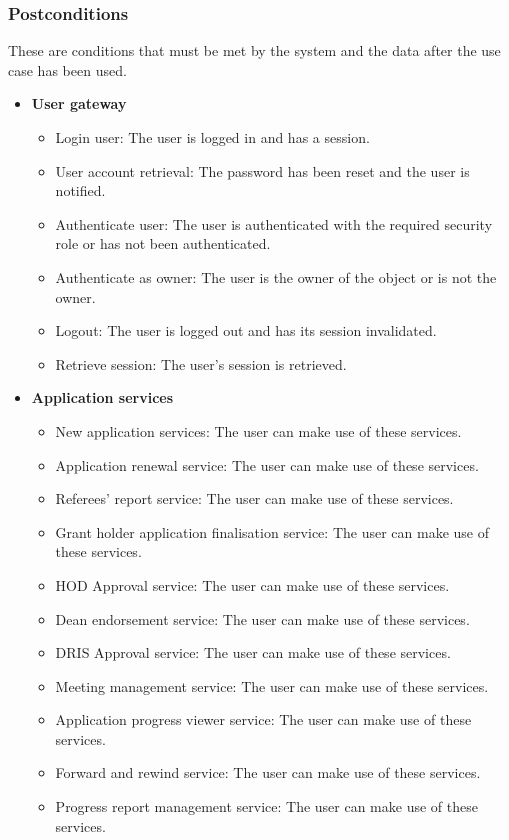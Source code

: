 \documentclass[12pt]{article}
\begin{document}
\subsubsection{Postconditions}
These are conditions that must be met by the system and the data after the use case has been used.\\
\begin{itemize}
	\item \textbf{User gateway}
		\begin{itemize}
			\item Login user: The user is logged in and has a session.
			\item User account retrieval: The password has been reset and the user is notified.				
			\item Authenticate user: The user is authenticated with the required security role or has not been authenticated.	
			\item Authenticate as owner: The user is the owner of the object or is not the owner.
			\item Logout: The user is logged out and has its session invalidated.
			\item Retrieve session: The user's session is retrieved.						
		\end{itemize}
		
	\item\textbf{Application services}
		\begin{itemize}
			\item New application services: The user can make use of these services.
			\item Application renewal service: The user can make use of these services.
			\item Referees' report service: The user can make use of these services.
			\item Grant holder application finalisation service:  The user can make use of these services.
			\item HOD Approval service: The user can make use of these services.
			\item Dean endorsement service: The user can make use of these services.
			\item DRIS Approval service:  The user can make use of these services.
			\item Meeting management service:  The user can make use of these services.
			\item Application progress viewer service: The user can make use of these services.
			\item Forward and rewind service: The user can make use of these services.
			\item Progress report management service: The user can make use of these services.	
		\end{itemize}
		

\end{itemize}
\end{document}
